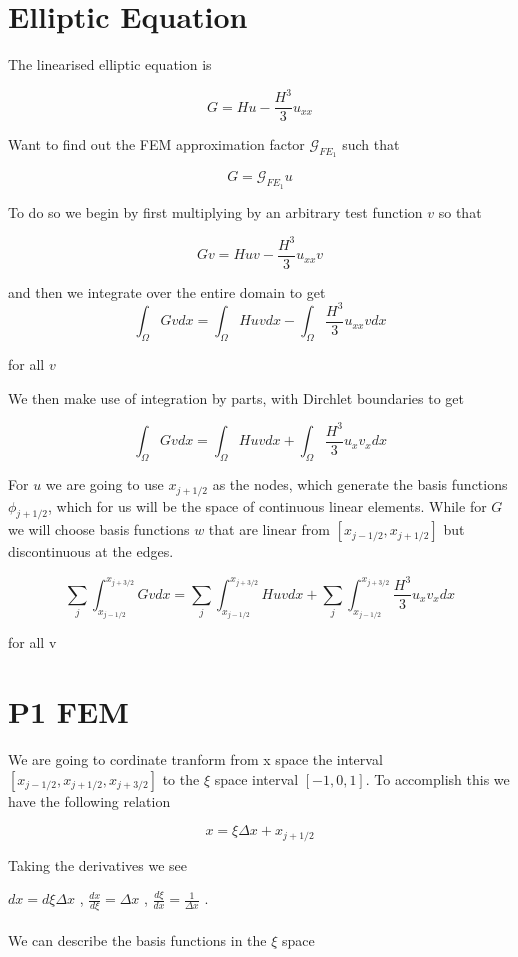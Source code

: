 \documentclass[12pt]{article}
\begin{document}
\section{Elliptic Equation}
The linearised elliptic equation is

\[G = Hu - \frac{H^3}{3}u_{xx}\]

Want to find out the FEM approximation factor $\mathcal{G}_{FE_1}$ such that

\[G = \mathcal{G}_{FE_1} u\]

To do so we begin by first multiplying by an arbitrary test function $v$ so that

\[Gv = Huv - \frac{H^3}{3}u_{xx}v\]

and then we integrate over the entire domain to get 
\[\int_\Omega Gv dx = \int_\Omega Huv dx - \int_\Omega \frac{H^3}{3}u_{xx}vdx\]

for all $v$

We then make use of integration by parts, with Dirchlet boundaries to get

\[\int_\Omega Gv dx = \int_\Omega Huv dx + \int_\Omega \frac{H^3}{3}u_{x}v_xdx\]

For $u$ we are going to use $x_{j + 1/2}$ as the nodes, which generate the basis functions $\phi_{j + 1/2}$, which for us will be the space of continuous linear elements. While for $G$ we will choose basis functions $w$ that are linear from $[x_{j-1/2}, x_{j+1/2}]$ but discontinuous at the edges.

\[\sum_{j}\int_{x_{j-1/2}}^{x_{j+3/2}} Gv dx = \sum_{j}\int_{x_{j-1/2}}^{x_{j+3/2}}  Huv dx + \sum_{j}\int_{x_{j-1/2}}^{x_{j+3/2}} \frac{H^3}{3}u_{x}v_{x}dx\]


for all v

\section{P1 FEM}
We are going to cordinate tranform from x space the interval $[x_{j-1/2},x_{j+1/2} ,x_{j+3/2}]$ to the $\xi$ space interval $[-1,0,1]$. To accomplish this we have the following relation

$$x = \xi\Delta x + x_{j+1/2}$$

Taking the derivatives we see


$dx = d\xi\Delta x$ , $\frac{dx}{d\xi} = \Delta x$ , $\frac{d\xi}{dx} = \frac{1}{\Delta x}$ . \\ \\ We can describe the basis functions in the $\xi$ space
\end{document}
